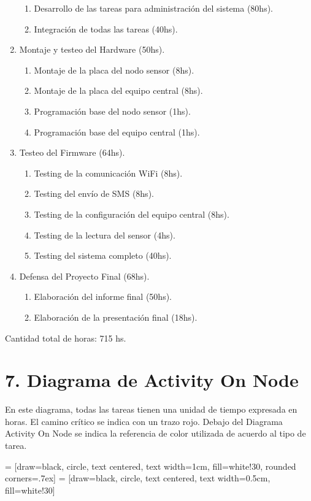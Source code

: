\documentclass[11pt]{charter}
\begin{document}
\begin{enumerate}
\begin{enumerate}
	\item Desarrollo de las tareas para administración del sistema (80hs).
	\item Integración de todas las tareas (40hs).
	\end{enumerate}
\item Montaje y testeo del Hardware (50hs).
	\begin{enumerate}
	\item Montaje de la placa del nodo sensor (8hs).
	\item Montaje de la placa del equipo central (8hs).
	\item Programación base del nodo sensor (1hs).
	\item Programación base del equipo central (1hs).
	\end{enumerate}
\item Testeo del Firmware (64hs).
	\begin{enumerate}
	\item Testing de la comunicación WiFi (8hs).
	\item Testing del envío de SMS (8hs).
	\item Testing de la configuración del equipo central (8hs).
	\item Testing de la lectura del sensor (4hs).
	\item Testing del sistema completo (40hs).
	\end{enumerate}
\item Defensa del Proyecto Final (68hs).
	\begin{enumerate}
	\item Elaboración del informe final (50hs).
	\item Elaboración de la presentación final (18hs).
	\end{enumerate}
\end{enumerate}

Cantidad total de horas: 715 hs.

\section{7. Diagrama de Activity On Node}
\label{sec:AoN}

En este diagrama, todas las tareas tienen una unidad de tiempo expresada en horas. El camino crítico se indica con un trazo rojo. Debajo del Diagrama Activity On Node se indica la referencia de color utilizada de acuerdo al tipo de tarea.

\usetikzlibrary{positioning}

 = [draw=black, circle, text centered, text width=1cm, fill=white!30, rounded corners=.7ex]
     = [draw=black, circle, text centered, text width=0.5cm, fill=white!30]
\end{document}
